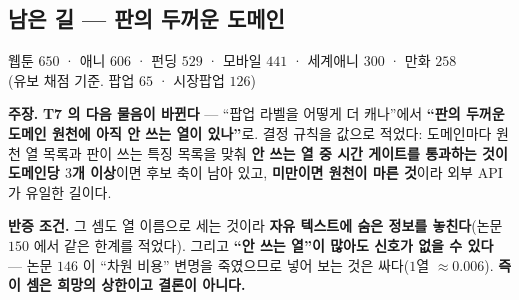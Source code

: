 \documentclass[10pt,a4paper]{article}
\newcommand{\claim}[2]{\begin{claimbox}\textbf{주장.} #1\par\smallskip
  \textcolor{gray!70}{\textbf{반증 조건.} #2}\end{claimbox}}
\begin{document}
\subsection*{남은 길 --- 판의 두꺼운 도메인}

\begin{center}
웹툰 $650$ · 애니 $606$ · 펀딩 $529$ · 모바일 $441$ · 세계애니 $300$ · 만화 $258$\\
(유보 채점 기준. 팝업 $65$ · 시장팝업 $126$)
\end{center}

\claim{\textbf{T7 의 다음 물음이 바뀐다} --- ``팝업 라벨을 어떻게 더 캐나''에서
\textbf{``판의 두꺼운 도메인 원천에 아직 안 쓰는 열이 있나''}로. 결정 규칙을 값으로
적었다: 도메인마다 원천 열 목록과 판이 쓰는 특징 목록을 맞춰 \textbf{안 쓰는 열 중 시간
게이트를 통과하는 것이 도메인당 $3$개 이상}이면 후보 축이 남아 있고, \textbf{미만이면
원천이 마른 것}이라 외부 API 가 유일한 길이다.}
{그 셈도 열 이름으로 세는 것이라 \textbf{자유 텍스트에 숨은 정보를 놓친다}(논문 $150$
에서 같은 한계를 적었다). 그리고 \textbf{``안 쓰는 열''이 많아도 신호가 없을 수
있다} --- 논문 $146$ 이 ``차원 비용'' 변명을 죽였으므로 넣어 보는 것은 싸다($1$열
$\approx 0.006$). \textbf{즉 이 셈은 희망의 상한이고 결론이 아니다.}}
\end{document}

